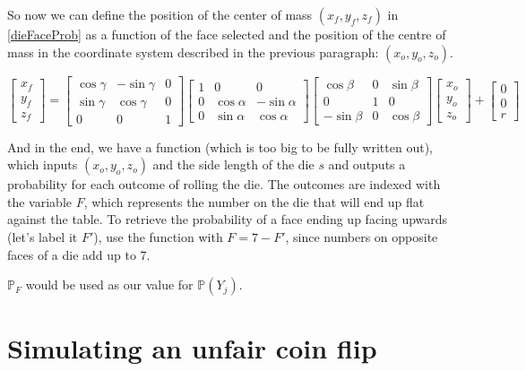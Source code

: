 \documentclass[english,12pt,a4paper,final]{article}
\begin{document}
So now we can define the position of the center of mass $(x_f, y_f, z_f)$ in \eqref{dieFaceProb} as a function of the face selected and the position of the centre of mass in the coordinate system described in the previous paragraph: $(x_o, y_o, z_o)$.

\begin{equation*}
	\begin{bmatrix}
		x_f \\ y_f \\ z_f
	\end{bmatrix}
	=
	\begin{bmatrix}
		\cos\gamma & -\sin\gamma & 0 \\
		\sin\gamma & \cos\gamma & 0 \\
		0 & 0 & 1
	\end{bmatrix}
	\begin{bmatrix}
		1 & 0 & 0 \\
		0 & \cos\alpha & -\sin\alpha \\
		0 & \sin\alpha & \cos\alpha
	\end{bmatrix}
	\begin{bmatrix}
		\cos\beta & 0 & \sin\beta \\
		0 & 1 & 0 \\
		-\sin\beta & 0 & \cos\beta
	\end{bmatrix}
	\begin{bmatrix}
		x_o \\ y_o \\ z_o
	\end{bmatrix}
	 +
	 \begin{bmatrix}
	 	0 \\ 0 \\ r
	 \end{bmatrix}
\end{equation*}

And in the end, we have a function (which is too big to be fully written out), which inputs $(x_o, y_o, z_o)$ and the side length of the die $s$ and outputs a probability for each outcome of rolling the die. The outcomes are indexed with the variable $F$, which represents the number on the die that will end up flat against the table. To retrieve the probability of a face ending up facing upwards (let's label it $F'$), use the function with $F=7-F'$, since numbers on opposite faces of a die add up to 7.

$\mathbb{P}_F$ would be used as our value for $\mathbb{P}(Y_j)$.

\section{Simulating an unfair coin flip}
\end{document}
